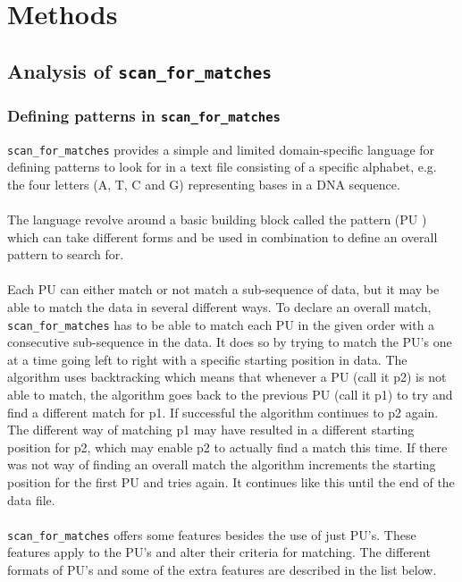 \documentclass[12pt]{article}
\newcommand{\scm}{\texttt{scan\_for\_matches} }
\newcommand{\pu}{PU }
\newcommand{\pus}{PU's }
\newcommand{\pusp}{PU's. }
\begin{document}
\section{Methods}
\subsection{Analysis of \scm}
\subsubsection{Defining patterns in \scm}
\scm provides a simple and limited domain-specific language for defining patterns to look for in a text file consisting
of a specific alphabet, e.g. the four letters (A, T, C and G) representing bases in a DNA sequence. \\ \\
The language revolve around a basic building block called the pattern (\pu) which can take different forms
and be used in combination to define an overall pattern to search for. \\ \\
Each \pu can either match or not match a sub-sequence of data, but it may be able to match the data in several different ways.
To declare an overall match, \scm has to be able to match each \pu in the given order with a consecutive sub-sequence in the
data. It does so by trying to match the \pus one at a time going left to right with a specific starting position in data. 
The algorithm uses backtracking which means that whenever a \pu (call it p2) is not able to match, the algorithm goes back to the
previous \pu (call it p1) to try and find a different match for p1. If successful the algorithm continues to p2 again. The
different way of matching p1 may have resulted in a different starting position for p2, which may enable p2 to 
actually find a match this time. If there was not way of finding an overall match the algorithm increments the starting
position for the first \pu and tries again. It continues like this until the end of the data file. \\ \\
\scm offers some features besides the use of just \pusp These features apply to the \pus and alter their criteria
for matching.
The different formats of \pus and some of the extra features are described in the list below.
\end{document}
